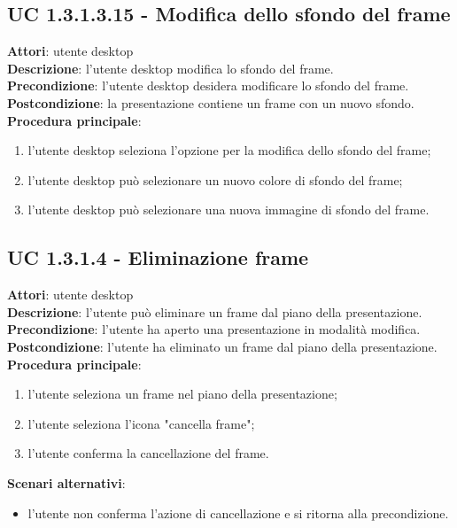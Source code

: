 \subsection{UC 1.3.1.3.15 - Modifica dello sfondo del frame}{
	\label{uc1.3.1.3.15}
	\textbf{Attori}: utente desktop \\
	\textbf{Descrizione}: l'utente desktop modifica lo sfondo del frame. \\
	\textbf{Precondizione}: l'utente desktop desidera modificare lo sfondo del frame.	\\
	\textbf{Postcondizione}: la presentazione contiene un frame con un nuovo sfondo.	\\
	\textbf{Procedura principale}:
	\begin{enumerate}
		\item l'utente desktop seleziona l'opzione per la modifica dello sfondo del frame;
		\item l'utente desktop può selezionare un nuovo colore di sfondo del frame;
		\item l'utente desktop può selezionare una nuova immagine di sfondo del frame.
	\end{enumerate}
	}
\subsection{UC 1.3.1.4 - Eliminazione frame}{
	\label{uc1.3.1.4}
	\textbf{Attori}: utente desktop \\
	\textbf{Descrizione}: l'utente può eliminare un frame dal piano della presentazione. \\
	\textbf{Precondizione}: l'utente ha aperto una presentazione in modalità modifica.	\\
	\textbf{Postcondizione}: l'utente ha eliminato un frame dal piano della presentazione.	\\
	\textbf{Procedura principale}:
	\begin{enumerate}
		\item l'utente seleziona un frame nel piano della presentazione;
		\item l'utente seleziona l'icona "cancella frame";
		\item l'utente conferma la cancellazione del frame.
	\end{enumerate}
	\textbf{Scenari alternativi}: 
	\begin{itemize}
		\item l'utente non conferma l'azione di cancellazione e si ritorna alla precondizione.
	\end{itemize}
}
